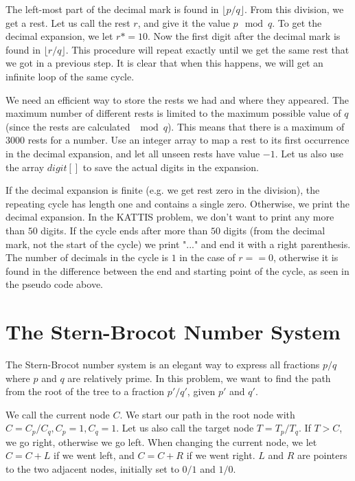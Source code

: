 \documentclass[11pt,a4paper,twoside]{article}
\begin{document}
The left-most part of the decimal mark is found in $\lfloor{p/q}\rfloor$. From this
division, we get a rest. Let us call the rest $r$, and give it the value $p
\mod q$. To get the decimal expansion, we let $r *= 10$. Now the first digit
after the decimal mark is found in $\lfloor{r/q}\rfloor$. This procedure will repeat
exactly until we get the same rest that we got in a previous step. It is clear
that when this happens, we will get an infinite loop of the same cycle.

We need an efficient way to store the rests we had and where they appeared. The
maximum number of different rests is limited to the maximum possible value of
$q$ (since the rests are calculated $\mod q$). This means that there is a
maximum of $3000$ rests for a number. Use an integer array to map a rest to its
first occurrence in the decimal expansion, and let all unseen rests have value
$-1$.  Let us also use the array $digit[]$ to save the actual digits in the
expansion.

       
If the decimal expansion is finite (e.g. we get rest zero in the division), the
repeating cycle has length one and contains a single zero. Otherwise, we print
the decimal expansion. In the KATTIS problem, we don't want to print any more
than $50$ digits. If the cycle ends after more than $50$ digits (from the
decimal mark, not the start of the cycle) we print "..." and end it with a
right parenthesis. The number of decimals in the cycle is $1$ in the case of
$r==0$, otherwise it is found in the difference between the end and starting
point of the cycle, as seen in the pseudo code above.

\section{The Stern-Brocot Number System}

The Stern-Brocot number system is an elegant way to express all fractions $p/q$ where $p$ and $q$ are relatively prime. In this problem, we want to find the path from the root of the tree to a fraction $p'/q'$, given $p'$ and $q'$. 

We call the current node $C$. We start our path in the root node with $C = C_{p}/C_{q}, C_{p} = 1, C_{q} = 1$. Let us also call the target node $T = T_{p}/T_{q}$. If $T > C$, we go right, otherwise we go left. When changing the current node, we let $C = C + L$ if we went left, and $C = C + R$ if we went right. $L$ and $R$ are pointers to the two adjacent nodes, initially set to $0/1$ and $1/0$.
\end{document}
